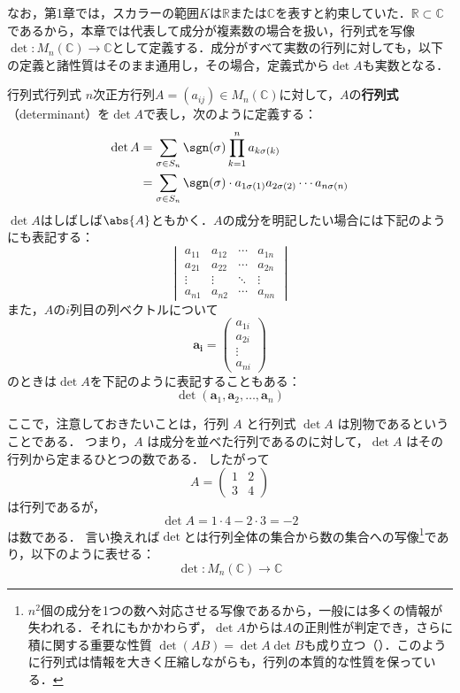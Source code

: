 なお，第1章では，スカラーの範囲$K$は$\mathbb{R}$または$\mathbb{C}$を表すと約束していた．$\mathbb{R} \subset \mathbb{C}$であるから，本章では代表して成分が複素数の場合を扱い，行列式を写像$\det \colon M_n(\mathbb{C}) \to \mathbb{C}$として定義する．成分がすべて実数の行列に対しても，以下の定義と諸性質はそのまま通用し，その場合，定義式から$\det A$も実数となる．

\begin{definition}{行列式}{行列式}
  $n$次正方行列$A = (a_{ij}) \in M_n(\mathbb{C})$に対して，$A$の\textbf{行列式}（determinant）を$\det A $で表し，次のように定義する：
  \begin{align*}
  \det A &=\sum_{\sigma \in S_n} \sgn(\sigma) \prod_{k=1}^n a_{k\sigma(k)} \\
  &=  \sum_{\sigma \in S_n} \sgn(\sigma) \cdot a_{1\sigma(1)} a_{2\sigma(2)} \dotsm a_{n\sigma(n)}
  \end{align*}
  $\det A$はしばしば$\abs{A}$ともかく．$A$の成分を明記したい場合には下記のようにも表記する：
  \[
  \begin{vmatrix}
  a_{11}  & a_{12}  & \cdots & a_{1n} \\
  a_{21}  & a_{22}  & \cdots & a_{2n} \\
  \vdots  & \vdots  & \ddots & \vdots \\
  a_{n1}  & a_{n2}  & \cdots & a_{nn}
  \end{vmatrix}
  \]
  また，$A$の$i$列目の列ベクトルについて
  \[
   \bm{a_i} =\begin{pmatrix} a_{1i}\\ a_{2i}  \\ \vdots \\ a_{ni} \end{pmatrix}
  \]
  のときは$\det A$を下記のように表記することもある：
  \[
  \det(\bm{a}_1, \bm{a}_2, \dots, \bm{a}_n)
  \]
\end{definition}

ここで，注意しておきたいことは，行列 $A$ と行列式 $\det A$ は別物であるということである．
つまり，$A$ は成分を並べた行列であるのに対して，$\det A$ はその行列から定まるひとつの数である．
したがって
\[
A=\begin{pmatrix}
1 & 2\\
3 & 4
\end{pmatrix}
\]
は行列であるが，
\[
\det A=1\cdot4-2\cdot3=-2
\]
は数である．
言い換えれば$\det$とは行列全体の集合から数の集合への写像\footnote{$n^2$個の成分を1つの数へ対応させる写像であるから，一般には多くの情報が失われる．それにもかかわらず，$\det A$からは$A$の正則性が判定でき，さらに積に関する重要な性質
$\det(AB)=\det A\det B$も成り立つ（）．このように行列式は情報を大きく圧縮しながらも，行列の本質的な性質を保っている．}であり，以下のように表せる：
\[
\det \colon M_n(\mathbb{C}) \to \mathbb{C}
\]

